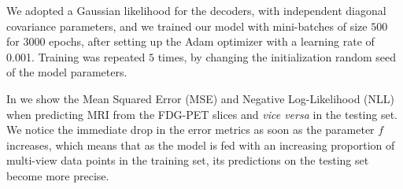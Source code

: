 	We adopted a Gaussian likelihood for the decoders, with independent diagonal covariance parameters, and
	we trained our model with mini-batches of size $500$ for $3000$ epochs, after setting up the Adam optimizer with a learning rate of 0.001.
	Training was repeated $5$ times, by changing the initialization random seed of the model parameters.
%	
	
	
	In  we show the Mean Squared Error (MSE) and Negative Log-Likelihood (NLL) when predicting MRI from the FDG-PET slices and \textit{vice versa} in the testing set.
	We notice the immediate drop in the error metrics as soon as the parameter $f$ increases,
	which means that as the model is fed with an increasing proportion of multi-view data points in the training set,
	its predictions on the testing set become more precise.
